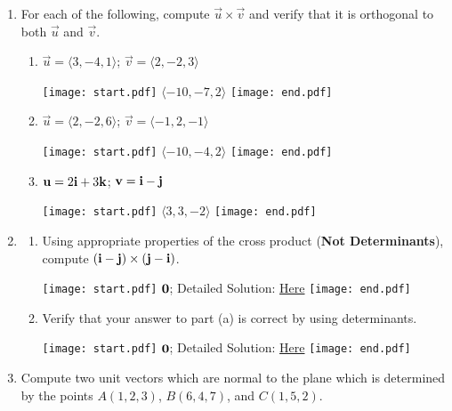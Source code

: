\documentclass[12pt]{article}
\begin{document}
\begin{enumerate}

\item For each of the following, compute $\overrightarrow{u}\times\overrightarrow{v}$ and verify that it is orthogonal to both $\overrightarrow{u}$ and $\overrightarrow{v}$.

\begin{enumerate}

\item $\overrightarrow{u}=\langle 3,-4,1 \rangle$; $\overrightarrow{v}=\langle 2,-2,3 \rangle$

\texttt{[image: start.pdf]}
{{$\langle -10,-7,2\rangle$}}
\texttt{[image: end.pdf]}


\item $\overrightarrow{u}=\langle 2,-2,6 \rangle$; $\overrightarrow{v}=\langle -1,2,-1 \rangle$

\texttt{[image: start.pdf]}
{{$\langle -10,-4,2\rangle$}}
\texttt{[image: end.pdf]}


\item ${\bf u}=2{\bf i}+3{\bf k}$; ${\bf v}={\bf i}-{\bf j}$

\texttt{[image: start.pdf]}
{{$\langle 3,3,-2\rangle$}}
\texttt{[image: end.pdf]}


\end{enumerate}

\item \begin{enumerate}

\item Using appropriate properties of the cross product ({\bf Not Determinants}), compute $({\bf i}-{\bf j})\times({\bf j}-{\bf i})$.

\texttt{[image: start.pdf]}
{{${\bf 0}$; Detailed Solution: \textcolor{blue}{\href{http://www.math.drexel.edu/classes/Calculus/resources/Math200HW/Solutions/04_200_Cross_Product_02.pdf}{Here}} }}
\texttt{[image: end.pdf]}


\item Verify that your answer to part (a) is correct by using determinants.

\texttt{[image: start.pdf]}
{{${\bf 0}$; Detailed Solution: \textcolor{blue}{\href{http://www.math.drexel.edu/classes/Calculus/resources/Math200HW/Solutions/04_200_Cross_Product_02.pdf}{Here}} }}
\texttt{[image: end.pdf]}


\end{enumerate}

\item Compute two unit vectors which are normal to the plane which is determined by the points $A(1,2,3)$, $B(6,4,7)$, and $C(1,5,2)$.


\end{enumerate}
\end{document}
